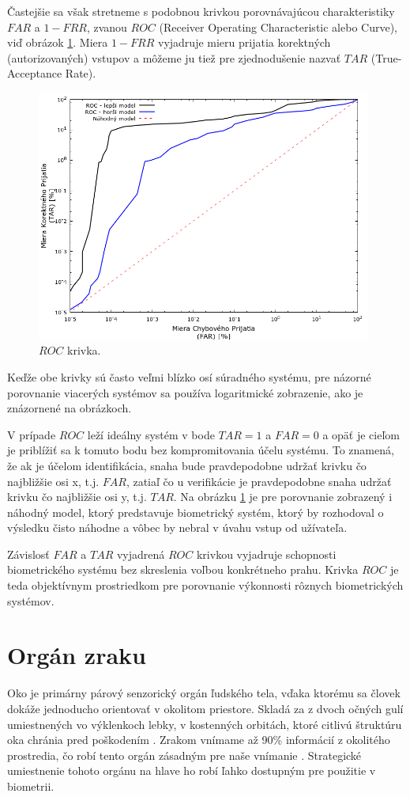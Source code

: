 Častejšie sa však stretneme s podobnou krivkou porovnávajúcou charakteristiky $FAR$ a $1 - FRR$, zvanou $ROC$ (Receiver Operating Characteristic alebo Curve), viď obrázok \ref{fig:roc}. Miera $1 - FRR$ vyjadruje mieru prijatia korektných (autorizovaných) vstupov a môžeme ju tiež pre zjednodušenie nazvať $TAR$ (True-Acceptance Rate).

\begin{figure}[!hb]
	\centering
	\includegraphics[width=11cm]{img/roc.png}
	\caption{$ROC$ krivka\cite{bio}.}
	\label{fig:roc}
\end{figure}

Keďže obe krivky sú často veľmi blízko osí súradného systému, pre názorné porovnanie viacerých systémov sa používa logaritmické zobrazenie, ako je znázornené na obrázkoch. 

V prípade $ROC$ leží ideálny systém v bode $TAR = 1$ a $FAR = 0$ a opäť je cieľom je priblížiť sa k tomuto bodu bez kompromitovania účelu systému. To znamená, že ak je účelom identifikácia, snaha bude pravdepodobne udržať krivku čo najbližšie osi x, t.j. $FAR$, zatiaľ čo u verifikácie je pravdepodobne snaha udržať krivku čo najbližšie osi y, t.j. $TAR$.
Na obrázku \ref{fig:roc} je pre porovnanie zobrazený i náhodný model, ktorý predstavuje biometrický systém, ktorý by rozhodoval o výsledku čisto náhodne a vôbec by nebral v úvahu vstup od užívateľa.

Závislosť $FAR$ a $TAR$ vyjadrená $ROC$ krivkou vyjadruje schopnosti biometrického systému bez skreslenia voľbou konkrétneho prahu. Krivka $ROC$ je teda objektívnym prostriedkom pre porovnanie výkonnosti rôznych biometrických systémov.

\chapter{Orgán zraku}\label{ch:kap1}
Oko je primárny párový senzorický orgán ľudského tela, vďaka ktorému sa človek dokáže jednoducho orientovať v okolitom priestore. Skladá za z dvoch očných gulí umiestnených vo výklenkoch lebky, v kostenných orbitách, ktoré citlivú štruktúru oka chránia pred poškodením \cite{zloz_oka}. Zrakom vnímame až 90\% informácií z okolitého prostredia, čo robí tento orgán zásadným pre naše vnímanie \cite{zmysly}. Strategické umiestnenie tohoto orgánu na hlave ho robí ľahko dostupným pre použitie v biometrii.

